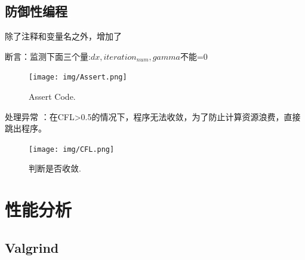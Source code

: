 \documentclass[10pt, a4paper]{article}
\begin{document}
\subsection{防御性编程}
除了注释和变量名之外，增加了

断言：监测下面三个量:$dx, iteration_{num}, gamma$不能=0

\begin{figure}[!h]
\centering
\texttt{[image: img/Assert.png]}
\caption{Assert Code.}
\label{fig:1}
\end{figure}

处理异常
：在CFL>0.5的情况下，程序无法收敛，为了防止计算资源浪费，直接跳出程序。
\begin{figure}[!h]
\centering
\texttt{[image: img/CFL.png]}
\caption{判断是否收敛.}
\label{fig:1}
\end{figure}

\clearpage
\section{性能分析}
\subsection{Valgrind}
\end{document}

